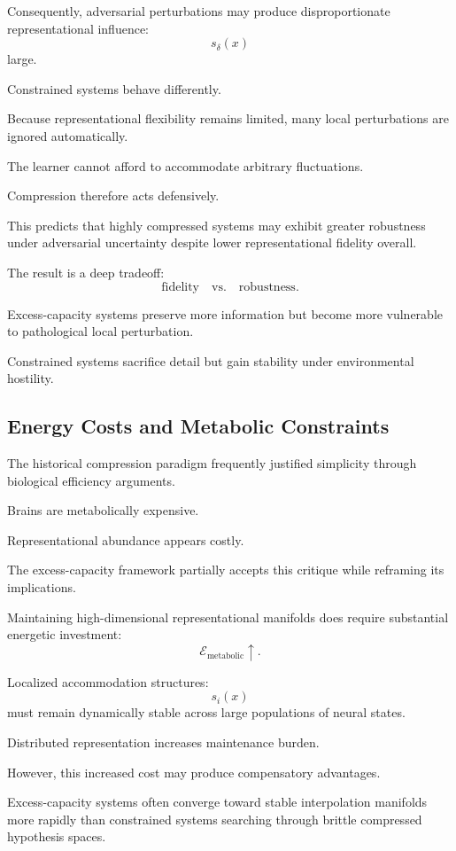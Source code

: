 \documentclass[12pt,a4paper]{article}
\begin{document}
Consequently, adversarial perturbations may produce disproportionate representational influence:
\[
s_\delta(x)
\]
large.

Constrained systems behave differently.

Because representational flexibility remains limited, many local perturbations are ignored automatically.

The learner cannot afford to accommodate arbitrary fluctuations.

Compression therefore acts defensively.

This predicts that highly compressed systems may exhibit greater robustness under adversarial uncertainty despite lower representational fidelity overall.

The result is a deep tradeoff:
\[
\text{fidelity}
\quad
\text{vs.}
\quad
\text{robustness}.
\]

Excess-capacity systems preserve more information but become more vulnerable to pathological local perturbation.

Constrained systems sacrifice detail but gain stability under environmental hostility.

\subsection{Energy Costs and Metabolic Constraints}

The historical compression paradigm frequently justified simplicity through biological efficiency arguments.

Brains are metabolically expensive.

Representational abundance appears costly.

The excess-capacity framework partially accepts this critique while reframing its implications.

Maintaining high-dimensional representational manifolds does require substantial energetic investment:
\[
\mathcal{E}_{\text{metabolic}}
\uparrow.
\]

Localized accommodation structures:
\[
s_i(x)
\]
must remain dynamically stable across large populations of neural states.

Distributed representation increases maintenance burden.

However, this increased cost may produce compensatory advantages.

Excess-capacity systems often converge toward stable interpolation manifolds more rapidly than constrained systems searching through brittle compressed hypothesis spaces.
\end{document}
